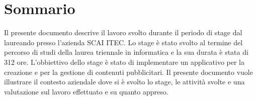 
\cleardoublepage
{}
{}
\begingroup
\let\clearpage\relax
\let\cleardoublepage\relax
\let\cleardoublepage\relax

\chapter*{Sommario}

Il presente documento descrive il lavoro svolto durante il periodo di stage dal laureando \myName presso l'azienda SCAI ITEC.
Lo stage è stato svolto al termine del percorso di studi della laurea triennale in informatica e la sua durata è stata di 312 ore.
L'obbiettivo dello stage è stato di implementare un applicativo per la creazione e per la gestione di contenuti pubblicitari.
Il presente documento vuole illustrare il contesto aziendale dove si è svolto lo stage, le attività svolte e una valutazione sul lavoro effettuato e su quanto appreso.

%
%

\endgroup			

\vfill

